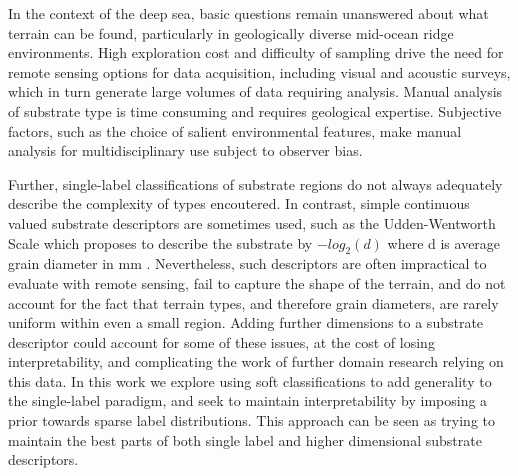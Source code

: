 In the context of the deep sea, basic questions remain unanswered about what terrain can be found, particularly in geologically diverse mid-ocean ridge environments. High exploration cost and difficulty of sampling drive the need for remote sensing options for data acquisition, including visual and acoustic surveys, which in turn generate large volumes of data requiring analysis.
Manual analysis of substrate type is time consuming and requires geological expertise. Subjective factors, such as the choice of salient environmental features, make manual analysis for multidisciplinary use subject to observer bias.

Further, single-label classifications of substrate regions do not always adequately describe the complexity of types encoutered. In contrast, simple continuous valued substrate descriptors are sometimes used, such as the Udden-Wentworth Scale which proposes to describe the substrate by $-log_2(d)$ where d is average grain diameter in mm \citep{Krumbein1937}. Nevertheless, such descriptors are often impractical to evaluate with remote sensing, fail to capture the shape of the terrain, and do not account for the fact that terrain types, and therefore grain diameters, are rarely uniform within even a small region. Adding further dimensions to a substrate descriptor could account for some of these issues, at the cost of losing interpretability, and complicating the work of further domain research relying on this data. In this work we explore using soft classifications to add generality to the single-label paradigm, and seek to maintain interpretability by imposing a prior towards sparse label distributions. This approach can be seen as trying to maintain the best parts of both single label and higher dimensional substrate descriptors.

